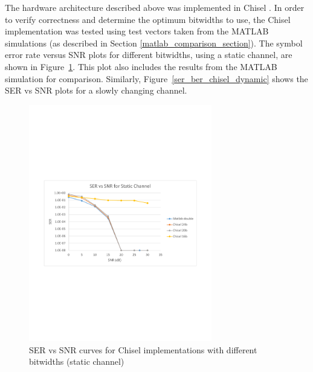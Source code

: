 \documentclass[journal]{IEEEtran}
\begin{document}
The hardware architecture described above was implemented in Chisel \cite{chisel}. In order to verify correctness and determine the optimum bitwidths to use, the Chisel implementation was tested using test vectors taken from the MATLAB simulations (as described in Section \ref{matlab_comparison_section}). The symbol error rate versus SNR plots for different bitwidths, using a static channel, are shown in Figure~\ref{ser_ber_chisel_static}. This plot also includes the results from the MATLAB simulation for comparison. Similarly, Figure~\ref{ser_ber_chisel_dynamic} shows the SER vs SNR plots for a slowly changing channel.

\begin{figure}[!h]
\centering
\includegraphics*[width=8cm, viewport = 80 260 560 530]{images/snr_ber_curves_chisel_static.pdf}
\caption{SER vs SNR curves for Chisel implementations with different bitwidths (static channel)}
\label{ser_ber_chisel_static}
\end{figure}
\end{document}
